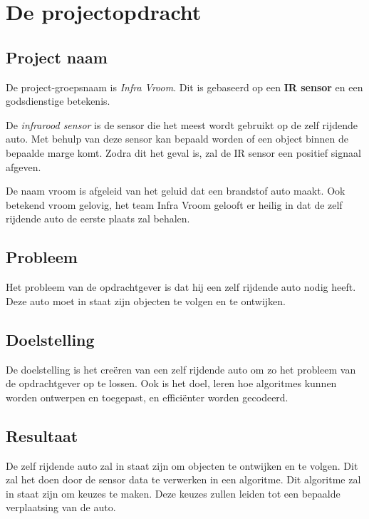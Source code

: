 \section{De projectopdracht}
\subsection{Project naam}
De project-groepsnaam is \textit{Infra Vroom}. Dit is gebaseerd op een \textbf{IR sensor} en een godsdienstige betekenis.

De \textit{infrarood sensor} is de sensor die het meest wordt gebruikt op de zelf rijdende auto. Met behulp van deze sensor kan bepaald worden of een object binnen de bepaalde marge komt. Zodra dit het geval is, zal de IR sensor een positief signaal afgeven.

De naam vroom is afgeleid van het geluid dat een brandstof auto maakt. Ook betekend vroom gelovig, het team Infra Vroom gelooft er heilig in dat de zelf rijdende auto de eerste plaats zal behalen.

\subsection{Probleem}
Het probleem van de opdrachtgever is dat hij een zelf rijdende auto nodig heeft. Deze auto moet in staat zijn objecten te volgen en te ontwijken.

\subsection{Doelstelling}
De doelstelling is het creëren van een zelf rijdende auto om zo het probleem van de opdrachtgever op te lossen. Ook is het doel, leren hoe algoritmes kunnen worden ontwerpen en toegepast, en efficiënter worden gecodeerd.

\subsection{Resultaat}
De zelf rijdende auto zal in staat zijn om objecten te ontwijken en te volgen. Dit zal het doen door de sensor data te verwerken in een algoritme. Dit algoritme zal in staat zijn om keuzes te maken. Deze keuzes zullen leiden tot een bepaalde verplaatsing van de auto.

